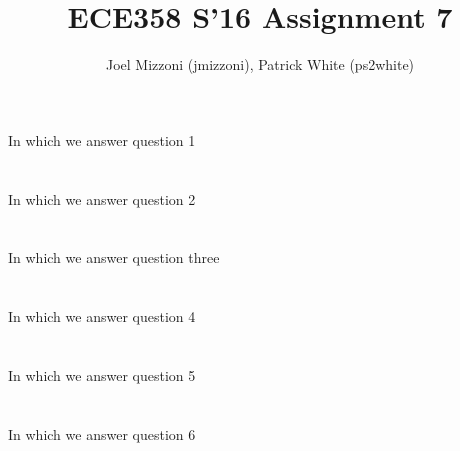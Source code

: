 \documentclass[10pt,a4paper]{article}
\author{Joel Mizzoni (jmizzoni), Patrick White (ps2white)}
\begin{document}
\title{ECE358 S'16 Assignment 7}
\maketitle
\section{}
In which we answer question 1
\section{}
In which we answer question 2
\section{}
In which we answer question three
\section{}
In which we answer question 4
\section{}
In which we answer question 5
\section{}
In which we answer question 6
\end{document}
